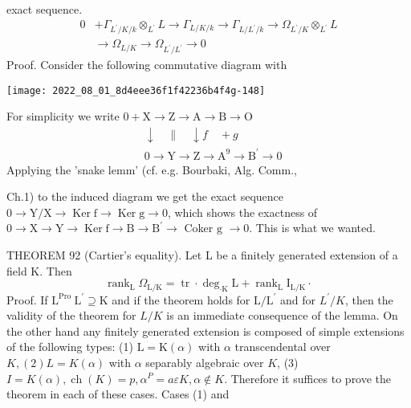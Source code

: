 exact sequence.
$$
\begin{aligned}
0 &+\Gamma_{L^{\prime} / K / k} \otimes_{L^{\prime}} L \rightarrow \Gamma_{L / K / k} \rightarrow \Gamma_{L / L^{\prime} / k} \rightarrow \Omega_{L^{\prime} / K} \otimes_{L^{\prime}} L \\
& \rightarrow \Omega_{L / K} \rightarrow \Omega_{L^{\prime} / L^{\prime}} \rightarrow 0
\end{aligned}
$$
Proof. Consider the following commutative diagram with

\texttt{[image: 2022\_08\_01\_8d4eee36f1f42236b4f4g-148]}

For simplicity we write $0+\mathrm{X} \rightarrow \mathrm{Z} \rightarrow \mathrm{A} \rightarrow \mathrm{B} \rightarrow \mathrm{O}$
$$
\begin{aligned}
&\downarrow \quad \| \quad \downarrow f \quad+g \\
&0 \rightarrow \mathrm{Y} \rightarrow \mathrm{Z} \rightarrow \mathrm{A}^{9} \rightarrow \mathrm{B}^{\prime} \rightarrow 0
\end{aligned}
$$
Applying the 'snake lemm' (cf. e.g. Bourbaki, Alg. Comm.,

Ch.1) to the induced diagram we get the exact sequence $0 \rightarrow \mathrm{Y} / \mathrm{X} \rightarrow \operatorname{Ker} \mathrm{f} \rightarrow \operatorname{Ker} \mathrm{g} \rightarrow 0$, which shows the exactness of $0 \rightarrow \mathrm{X} \rightarrow \mathrm{Y} \rightarrow \operatorname{Ker} \mathrm{f} \rightarrow \mathrm{B} \rightarrow \mathrm{B}^{\prime} \rightarrow$ Coker $\mathrm{g}$ $\rightarrow 0$. This is what we wanted.

THEOREM 92 (Cartier's equality). Let L be a finitely generated extension of a field $\mathrm{K}$. Then
$$
\operatorname{rank}_{\mathrm{L}} \Omega_{\mathrm{L} / \mathrm{K}}=\operatorname{tr} \cdot \operatorname{deg}_{\cdot \mathrm{K}} \mathrm{L}+\operatorname{rank}_{\mathrm{L}} \mathrm{I}_{\mathrm{L} / \mathrm{K}} \cdot
$$
Proof. If $\mathrm{L}^{\text {Pro }} \mathrm{L}^{\prime} \supseteq \mathrm{K}$ and if the theorem holds for $\mathrm{L} / \mathrm{L}^{\prime}$ and for $L^{\prime} / K$, then the validity of the theorem for $L / K$ is an immediate consequence of the lemma. On the other hand any finitely generated extension is composed of simple extensions of the following types: (1) $\mathrm{L}=\mathrm{K}(\alpha)$ with $\alpha$ transcendental over $K,(2) L=K(\alpha)$ with $\alpha$ separably algebraic over $K$, (3) $I=K(\alpha), \operatorname{ch}(K)=p, \alpha^{P}=a \varepsilon K, \alpha \notin K$. Therefore it suffices to prove the theorem in each of these cases. Cases (1) and

